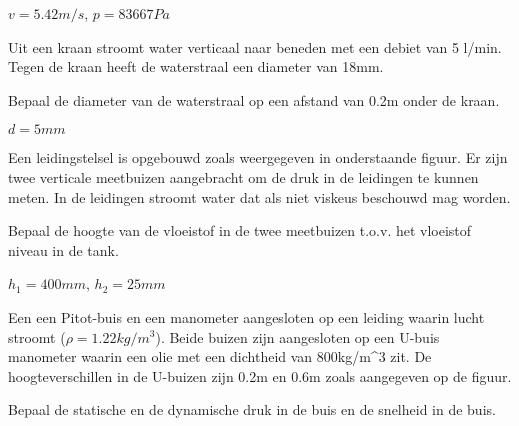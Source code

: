 	\begin{antwoord}
		$v = \unit{5.42}{m/s}$, $p = \unit{83667}{Pa}$
	\end{antwoord}
	\begin{toepassing*}
		\label{waterkraan}
Uit een kraan stroomt water verticaal naar beneden met een debiet van 5 l/min. Tegen de kraan heeft de waterstraal een diameter van 18mm. 

Bepaal de diameter van de waterstraal op een afstand van 0.2m onder de kraan.
		\begin{center}
			
		\end{center}
	\end{toepassing*}
	\begin{antwoord}
		$d = \unit{5}{mm}$
	\end{antwoord}
	\begin{toepassing}
		\label{drukhoogte}
Een leidingstelsel is opgebouwd zoals weergegeven in onderstaande figuur. Er zijn twee verticale meetbuizen aangebracht om de druk in de leidingen te kunnen meten. In de leidingen stroomt water dat als niet viskeus beschouwd mag worden.
		
Bepaal de hoogte van de vloeistof in de twee meetbuizen t.o.v. het vloeistof niveau in de tank.
		\begin{center}
			
		\end{center}
	\end{toepassing}
	\begin{antwoord}
		$h_1 = \unit{400}{mm}$, $h_2 = \unit{25}{mm}$
	\end{antwoord}
	\begin{toepassing}
		\label{dynamische_druk}
Een een Pitot-buis en een manometer aangesloten op een leiding waarin lucht stroomt ($\rho=\unit{1.22}{kg/m^3}$). Beide buizen zijn aangesloten op een U-buis manometer waarin een olie met een dichtheid van \unit{800}{kg/m^3} zit. De hoogteverschillen in de U-buizen zijn 0.2m en 0.6m zoals aangegeven op de figuur.

Bepaal de statische en de dynamische druk in de buis en de snelheid in de buis.
		\begin{center}
			
		\end{center}
	\end{toepassing}
